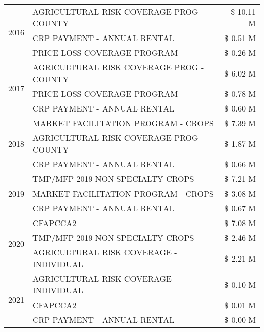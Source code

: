 \begin{tabular}{llr}
\cline{1-3}
\multirow[t]{3}{*}{2016} & AGRICULTURAL RISK COVERAGE PROG - COUNTY & \$ 10.11 M \\
 & CRP PAYMENT - ANNUAL RENTAL & \$ 0.51 M \\
 & PRICE LOSS COVERAGE PROGRAM & \$ 0.26 M \\
\cline{1-3}
\multirow[t]{3}{*}{2017} & AGRICULTURAL RISK COVERAGE PROG - COUNTY & \$ 6.02 M \\
 & PRICE LOSS COVERAGE PROGRAM & \$ 0.78 M \\
 & CRP PAYMENT - ANNUAL RENTAL & \$ 0.60 M \\
\cline{1-3}
\multirow[t]{3}{*}{2018} & MARKET FACILITATION PROGRAM - CROPS & \$ 7.39 M \\
 & AGRICULTURAL RISK COVERAGE PROG - COUNTY & \$ 1.87 M \\
 & CRP PAYMENT - ANNUAL RENTAL & \$ 0.66 M \\
\cline{1-3}
\multirow[t]{3}{*}{2019} & TMP/MFP 2019 NON SPECIALTY CROPS & \$ 7.21 M \\
 & MARKET FACILITATION PROGRAM - CROPS & \$ 3.08 M \\
 & CRP PAYMENT - ANNUAL RENTAL & \$ 0.67 M \\
\cline{1-3}
\multirow[t]{3}{*}{2020} & CFAPCCA2 & \$ 7.08 M \\
 & TMP/MFP 2019 NON SPECIALTY CROPS & \$ 2.46 M \\
 & AGRICULTURAL RISK COVERAGE - INDIVIDUAL & \$ 2.21 M \\
\cline{1-3}
\multirow[t]{3}{*}{2021} & AGRICULTURAL RISK COVERAGE - INDIVIDUAL & \$ 0.10 M \\
 & CFAPCCA2 & \$ 0.01 M \\
 & CRP PAYMENT - ANNUAL RENTAL & \$ 0.00 M \\
\cline{1-3}
\bottomrule
\end{tabular}
